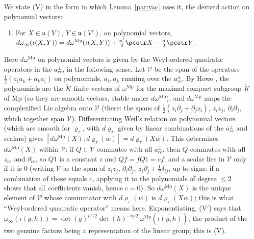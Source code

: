 \documentclass[10pt]{amsart}
\theoremstyle{definition}
\theoremstyle{remark}
\begin{document}
We state (V) in the form in which Lemma~\ref{par:vac} uses it, the derived action on polynomial
vectors:
\begin{enumerate}
\item[(V$'$)] For $X\in\mathfrak u(V)$, $Y\in\mathfrak u(V')$, on polynomial vectors,
$d\omega_\infty(\iota(X,Y))=d\omega^{\mathrm{Mp}}(\iota(X,Y))+\tfrac{n'}2\pcotr X-\tfrac n2\pcotr Y$.
\end{enumerate}
Here $d\omega^{\mathrm{Mp}}$ on polynomial vectors is given by the Weyl-ordered quadratic operators
in the $a^\pm_{rc}$, in the following sense. Let $\mathcal V$ be the span of the operators $\frac12(a_ia_k+a_ka_i)$ on polynomials, $a_i,a_k$ running over the $a^\pm_{rc}$. By Howe \cite[p.~537, (2.2), and (2.3)]{HoweJAMS}, the polynomials are the $\widetilde K$-finite vectors of $\omega^{\mathrm{Mp}}$ for the maximal compact subgroup $\widetilde K$ of $\mathrm{Mp}$ (so they are smooth vectors, stable under $d\omega^{\mathrm{Mp}}$), and $d\omega^{\mathrm{Mp}}$ maps the complexified Lie algebra onto $\mathcal V$ (there: the spans of $\frac12(z_i\partial_j+\partial_jz_i)$, $z_iz_j$, $\partial_i\partial_j$, which together span $\mathcal V$). Differentiating Weil's relation on polynomial vectors (which are smooth for $\varrho_\tau$, with $d\varrho_\tau$ given by linear combinations of the $a^\pm_{rc}$ and scalars) gives $[d\omega^{\mathrm{Mp}}(X),d\varrho_\tau(w)]=d\varrho_\tau(Xw)$. This determines $d\omega^{\mathrm{Mp}}(X)$ within $\mathcal V$: if $Q\in\mathcal V$ commutes with all $a^\pm_{rc}$, then $Q$ commutes with all $z_{rc}$ and $\partial_{rc}$, so $Q1$ is a constant $c$ and $Qf=fQ1=cf$; and a scalar lies in $\mathcal V$ only if it is $0$ (writing $\mathcal V$ as the span of $z_iz_j$, $\partial_i\partial_j$, $z_i\partial_j+\frac12\delta_{ij}$, up to signs: if a combination of these equals $c$, applying it to the polynomials of degree $\le2$ shows that all coefficients vanish, hence $c=0$). So $d\omega^{\mathrm{Mp}}(X)$ is the unique element of $\mathcal V$ whose commutator with $d\varrho_\tau(w)$ is $d\varrho_\tau(Xw)$; this is what ``Weyl-ordered quadratic operator'' means here. Exponentiating, (V$'$) says that
$\omega_\infty(\iota(g,h))=\det(g)^{n'/2}\det(h)^{-n/2}\,\omega^{\mathrm{Mp}}(\widetilde{\iota(g,h)})$,
the product of the two genuine factors being a representation of the linear group; this is (V).
\end{document}
